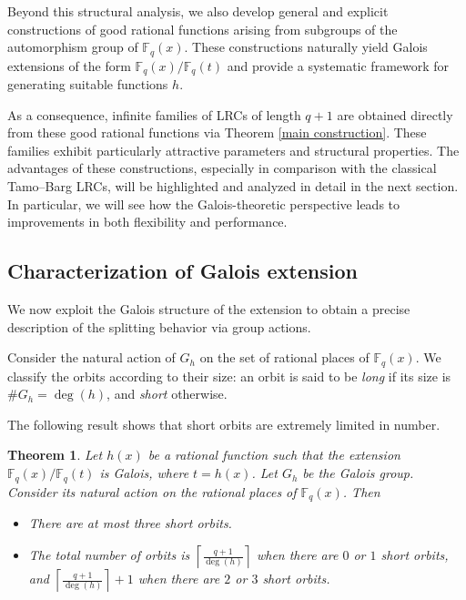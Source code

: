 \documentclass[1p,final]{elsarticle}
\newtheorem{theorem}{Theorem}[section]
\newtheorem{open problem}[theorem]{Open Problem}
\begin{document}
Beyond this structural analysis, we also develop general and explicit constructions of good rational functions arising from subgroups of the automorphism group of $\mathbb{F}_{q}(x)$. These constructions naturally yield Galois extensions of the form $\mathbb{F}_{q}(x)/\mathbb{F}_{q}(t)$ and provide a systematic framework for generating suitable functions $h$.

As a consequence, infinite families of LRCs of length $q+1$ are obtained directly from these good rational functions via Theorem \ref{main construction}. These families exhibit particularly attractive parameters and structural properties. The advantages of these constructions, especially in comparison with the classical Tamo--Barg LRCs, will be highlighted and analyzed in detail in the next section. In particular, we will see how the Galois-theoretic perspective leads to improvements in both flexibility and performance.



\subsection{Characterization of Galois extension}

We now exploit the Galois structure of the extension to obtain a precise description of the splitting behavior via group actions.

\medskip

Consider the natural action of $G_{h}$ on the set of rational places of $\mathbb{F}_{q}(x)$. We classify the orbits according to their size: an orbit is said to be \emph{long} if its size is $\#G_{h}=\deg(h)$, and \emph{short} otherwise.

\medskip

The following result shows that short orbits are extremely limited in number.

\begin{theorem}\label{3 short}
Let $h(x)$ be a rational function such that the extension $\mathbb{F}_{q}(x)/\mathbb{F}_{q}(t)$ is Galois, where $t=h(x)$. Let $G_{h}$ be the Galois group. Consider its natural action on the rational places of $\mathbb{F}_{q}(x)$. Then 
\begin{itemize}
\item[(i)] There are at most three short orbits.
\item[(ii)] The total number of orbits is $\left \lceil \frac{q+1}{\deg(h)}  \right \rceil$ when there are $0$ or $1$ short orbits, and $\left \lceil \frac{q+1}{\deg(h)}  \right \rceil+1$ when there are $2$ or $3$ short orbits.
\end{itemize}
\end{theorem}
\end{document}
